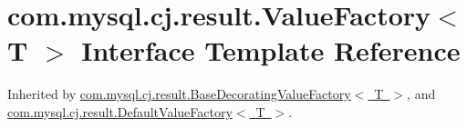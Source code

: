 \hypertarget{interfacecom_1_1mysql_1_1cj_1_1result_1_1_value_factory}{}\section{com.\+mysql.\+cj.\+result.\+Value\+Factory$<$ T $>$ Interface Template Reference}
\label{interfacecom_1_1mysql_1_1cj_1_1result_1_1_value_factory}


Inherited by \mbox{\hyperlink{classcom_1_1mysql_1_1cj_1_1result_1_1_base_decorating_value_factory}{com.\+mysql.\+cj.\+result.\+Base\+Decorating\+Value\+Factory$<$ T $>$}}, and \mbox{\hyperlink{classcom_1_1mysql_1_1cj_1_1result_1_1_default_value_factory}{com.\+mysql.\+cj.\+result.\+Default\+Value\+Factory$<$ T $>$}}.

